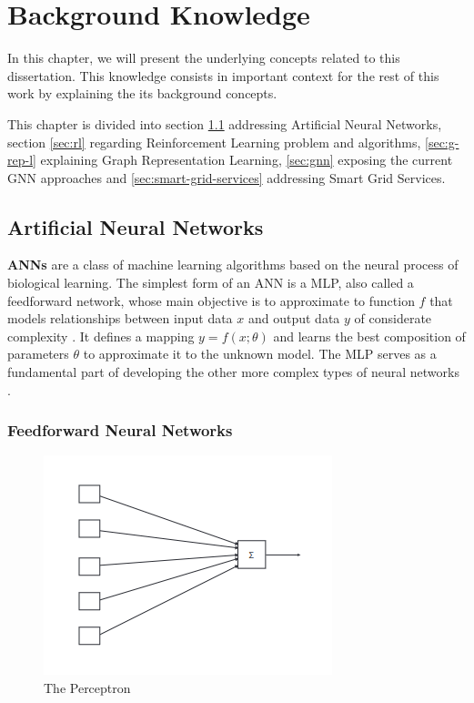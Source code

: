 \chapter{Background Knowledge} \label{chap:background-knowledge}

In this chapter, we will present the underlying concepts related to this dissertation. This knowledge consists in important context for the rest of this work by explaining the its background concepts. \par
This chapter is divided into section \ref{sec:ann} addressing Artificial Neural Networks, section \ref{sec:rl} regarding Reinforcement Learning problem and algorithms, \ref{sec:g-rep-l} explaining Graph Representation Learning, \ref{sec:gnn} exposing the current \ac{GNN} approaches and \ref{sec:smart-grid-services} addressing Smart Grid Services.

\section{Artificial Neural Networks} \label{sec:ann}

\textbf{\acp{ANN}} are a class of machine learning algorithms based on the neural process of biological learning. The simplest form of an \ac{ANN} is a \ac{MLP}, also called a feedforward network, whose main objective is to approximate to function $f$ that models relationships between input data $x$ and output data $y$ of considerate complexity \cite{charniakIntroductionDeepLearning2018, goodfellowDeepLearning2016}. It defines a mapping $y=f(x;\theta)$ and learns the best composition of parameters $\theta$ to approximate it to the unknown model. The \ac{MLP} serves as a fundamental part of developing the other more complex types of neural networks \cite{charniakIntroductionDeepLearning2018}. \par

\subsection{Feedforward Neural Networks}

\begin{figure}
	\centering
	\includegraphics[width=0.50\linewidth]{./figures/perceptron.png}
	\caption{The Perceptron \cite{charniakIntroductionDeepLearning2018}}
	\label{fig:perceptron}
\end{figure}

